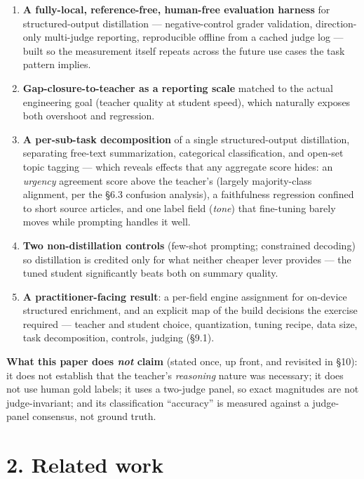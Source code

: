 \documentclass[11pt]{article}
\providecommand{\tightlist}{\setlength{\itemsep}{0pt}\setlength{\parskip}{0pt}}
\providecommand{\tightlist}{%
  \setlength{\itemsep}{0pt}\setlength{\parskip}{0pt}}
\begin{document}
\begin{enumerate}
\def\labelenumi{\arabic{enumi}.}
\tightlist
\item
  \textbf{A fully-local, reference-free, human-free evaluation harness}
  for structured-output distillation --- negative-control grader
  validation, direction-only multi-judge reporting, reproducible offline
  from a cached judge log --- built so the measurement itself repeats
  across the future use cases the task pattern implies.
\item
  \textbf{Gap-closure-to-teacher as a reporting scale} matched to the
  actual engineering goal (teacher quality at student speed), which
  naturally exposes both overshoot and regression.
\item
  \textbf{A per-sub-task decomposition} of a single structured-output
  distillation, separating free-text summarization, categorical
  classification, and open-set topic tagging --- which reveals effects
  that any aggregate score hides: an \emph{urgency} agreement score
  above the teacher's (largely majority-class alignment, per the §6.3
  confusion analysis), a faithfulness regression confined to short
  source articles, and one label field (\emph{tone}) that fine-tuning
  barely moves while prompting handles it well.
\item
  \textbf{Two non-distillation controls} (few-shot prompting;
  constrained decoding) so distillation is credited only for what
  neither cheaper lever provides --- the tuned student significantly
  beats both on summary quality.
\item
  \textbf{A practitioner-facing result}: a per-field engine assignment
  for on-device structured enrichment, and an explicit map of the build
  decisions the exercise required --- teacher and student choice,
  quantization, tuning recipe, data size, task decomposition, controls,
  judging (§9.1).
\end{enumerate}

\textbf{What this paper does \emph{not} claim} (stated once, up front,
and revisited in §10): it does not establish that the teacher's
\emph{reasoning} nature was necessary; it does not use human gold
labels; it uses a two-judge panel, so exact magnitudes are not
judge-invariant; and its classification ``accuracy'' is measured against
a judge-panel consensus, not ground truth.

\section{2. Related work}\label{related-work}
\end{document}
